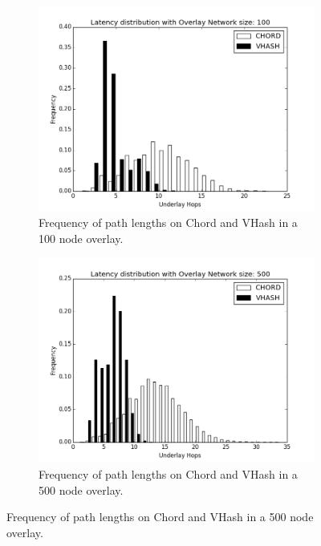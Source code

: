 \documentclass[10pt, conference, letterpaper]{IEEEtran}
\begin{document}
\begin{figure}

\begin{subfigure}{\columnwidth}
	\includegraphics[width=\linewidth]{hist_100}
	\caption{Frequency of path lengths on Chord and VHash in a 100 node overlay.}	
	\label{hist100}
\end{subfigure}

\begin{subfigure}{\columnwidth}
	\centering
	\includegraphics[width=\linewidth]{hist_500}
	\caption{Frequency of path lengths on Chord and VHash in a 500 node overlay.}
	\label{hist500}
\end{subfigure}


\end{figure}
\end{document}
